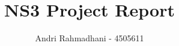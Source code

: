 \documentclass{tudelft-report}
\begin{document}
\frontmatter

\title[ET4394 Wireless Networking]{NS3 Project Report}
\author{Andri Rahmadhani - 4505611}
\makecover

%

%

\tableofcontents

\mainmatter








%

\renewcommand\bibname{References}

\end{document}
